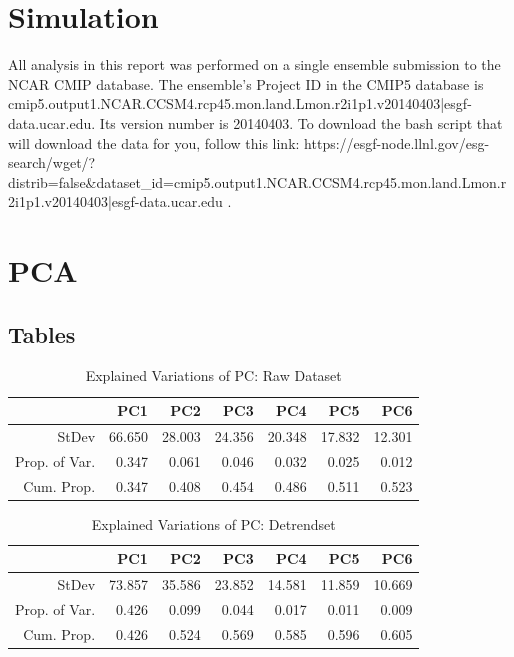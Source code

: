 \documentclass[11pt]{article}
\begin{document}
\appendix
\section{Simulation}
All analysis in this report was performed on a single ensemble submission to the
NCAR CMIP database. The ensemble's Project ID in the CMIP5 database is
cmip5.output1.NCAR.CCSM4.rcp45.mon.land.Lmon.r2i1p1.v20140403|esgf-data.ucar.edu.
Its version number is 20140403. To download the bash script that will download
the data for you, follow this link:
https://esgf-node.llnl.gov/esg-search/wget/?distrib=false&dataset_id=cmip5.output1.NCAR.CCSM4.rcp45.mon.land.Lmon.r2i1p1.v20140403|esgf-data.ucar.edu
.

\section{PCA}
\subsection{Tables}
\begin{table}[ht]
	\centering
	\begin{tabular}{rrrrrrr}
		\hline
		& PC1 & PC2 & PC3 & PC4 & PC5 & PC6 \\ 
		\hline
		StDev & 66.650 & 28.003 & 24.356 & 20.348 & 17.832 & 12.301 \\ 
		Prop. of Var. & 0.347 & 0.061 & 0.046 & 0.032 & 0.025 & 0.012 \\ 
		Cum. Prop.& 0.347 & 0.408 & 0.454 & 0.486 & 0.511 & 0.523 \\ 
		\hline
	\end{tabular}
	\caption{Explained Variations of PC: Raw Dataset}\label{table:rawdataprop}
\end{table}
\begin{table}[ht]
	\centering
	\begin{tabular}{rrrrrrr}
		\hline
		& PC1 & PC2 & PC3 & PC4 & PC5 & PC6 \\ 
		\hline
		StDev & 73.857 & 35.586 & 23.852 & 14.581 & 11.859 & 10.669 \\ 
		Prop. of Var. & 0.426 & 0.099 & 0.044 & 0.017 & 0.011 & 0.009 \\ 
		Cum. Prop. & 0.426 & 0.524 & 0.569 & 0.585 & 0.596 & 0.605 \\ 
		\hline
	\end{tabular}
	\caption{Explained Variations of PC: Detrendset}\label{table:detrendprop}
\end{table}
\pagebreak
\end{document}
